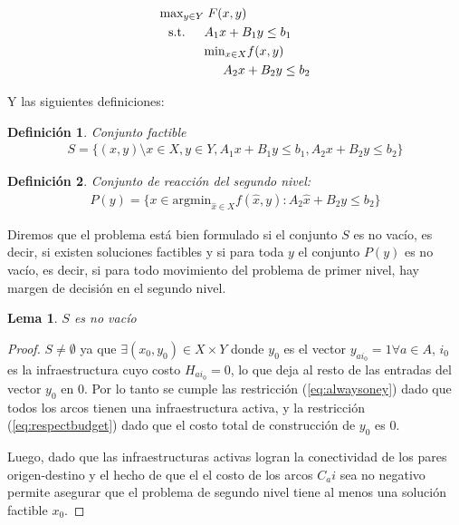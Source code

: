 \documentclass{article}
\newtheorem{definition}{Definición}
\newtheorem{lemma}{Lema}
\newcommand{\modelspace}{\hspace{1.5em}}
\begin{document}
  \begin{align}
    \text{max}_{y \in Y}    & \; F(x, y) \\
    \text{s.t.} \modelspace & A_1 x + B_1 y \leq b_1 \\
                            & \text{min}_{x \in X} f(x, y) \\
                            & \modelspace A_2 x + B_2 y \leq b_2
  \end{align}

  Y las siguientes definiciones:

  \begin{definition}
    Conjunto factible
    \begin{align}
      S = \{(x, y) \setminus x \in X, y \in Y, A_1 x + B_1 y \leq b_1, A_2 x + B_2 y \leq b_2 \}
    \end{align}
  \end{definition}

  \begin{definition}
    Conjunto de reacción del segundo nivel:
    \begin{align}
      P(y) = \{ x \in \text{argmin}_{\hat{x} \in X} f(\hat{x}, y) : A_2 \hat{x} + B_2 y \leq b_2 \}
    \end{align}
  \end{definition}

  Diremos que el problema está bien formulado si el conjunto $S$ es no vacío, es decir, si existen soluciones factibles y si para toda $y$ el conjunto $P(y)$ es no vacío, es decir, si para todo movimiento del problema de primer nivel, hay margen de decisión en el segundo nivel.

  \begin{lemma}$S$ es no vacío
  \end{lemma}

  \begin{proof}
    $S \neq \emptyset$ ya que $\exists (x_0, y_0) \in X \times Y$ donde $y_0$ es el vector $y_{ai_0} = 1 \forall a \in A$, $i_0$ es la infraestructura cuyo costo $H_{ai_0} = 0$, lo que deja al resto de las entradas del vector $y_0$ en $0$. Por lo tanto se cumple las restricción (\ref{eq:alwaysoney}) dado que todos los arcos tienen una infraestructura activa, y la restricción (\ref{eq:respectbudget}) dado que el costo total de construcción de $y_0$ es $0$.

    Luego, dado que las infraestructuras activas logran la conectividad de los pares origen-destino y el hecho de que el el costo de los arcos $C_ai$ sea no negativo permite asegurar que el problema de segundo nivel tiene al menos una solución factible $x_0$.
  \end{proof}
\end{document}
